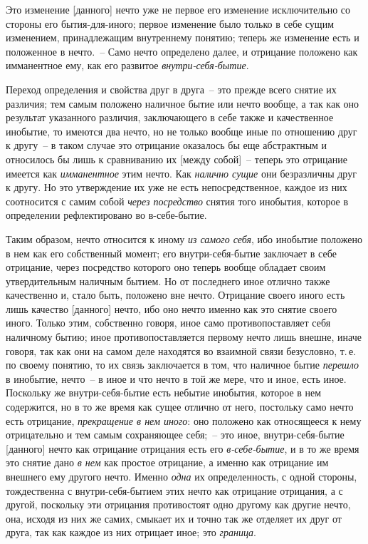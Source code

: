 Это изменение [данного] нечто уже не первое его
изменение исключительно со стороны его бытия-для-иного;
первое изменение было только в себе сущим изменением,
принадлежащим внутреннему понятию; теперь
же изменение есть и положенное в нечто.~-- Само нечто
определено далее, и отрицание положено как имманентное
ему, как его развитое \emph{внутри-себя-бытие}.

Переход определения и свойства друг в друга~-- это
прежде всего снятие их различия; тем самым положено
наличное бытие или нечто вообще, а так как оно результат
указанного различия, заключающего в себе также и
качественное инобытие, то имеются два нечто, но не
только вообще иные по отношению друг к другу~-- в таком
случае это отрицание оказалось бы еще абстрактным
и относилось бы лишь к сравниванию их [между собой]~--
теперь это отрицание имеется как \emph{имманентное} этим
нечто. Как \emph{налично сущие} они безразличны друг к другу.
Но это утверждение их уже не есть непосредственное,
каждое из них соотносится с самим собой \emph{через посредство}
снятия того инобытия, которое в определении рефлектировано
во в-себе-бытие.

Таким образом, нечто относится к иному \emph{из самого
себя}, ибо инобытие положено в нем как его собственный
момент; его внутри-себя-бытие заключает в себе отрицание,
через посредство которого оно теперь вообще обладает
своим утвердительным наличным бытием. Но от
последнего иное отлично также качественно и, стало быть,
положено вне нечто. Отрицание своего иного есть лишь
качество [данного] нечто, ибо оно нечто именно как это
снятие своего иного. Только этим, собственно говоря,
иное само противопоставляет себя наличному бытию;
иное противопоставляется первому нечто лишь внешне,
иначе говоря, так как они на самом деле находятся во
взаимной связи безусловно, т.\,е. по своему понятию, то
их связь заключается в том, что наличное бытие \emph{перешло}
в инобытие, нечто~-- в иное и что нечто в той же мере,
что и иное, есть иное. Поскольку же внутри-себя-бытие
есть небытие инобытия, которое в нем содержится, но в
то же время как сущее отлично от него, постольку само
нечто есть отрицание, \emph{прекращение в нем иного}: оно положено
как относящееся к нему отрицательно и тем самым
сохраняющее себя;~-- это иное, внутри-себя-бытие
[данного] нечто как отрицание отрицания есть его \emph{в-себе-бытие},
и в то же время это снятие дано \emph{в нем} как простое
отрицание, а именно как отрицание им внешнего
ему другого нечто. Именно \emph{одна} их определенность, с
одной стороны, тождественна с внутри-себя-бытием этих
нечто как отрицание отрицания, а с другой, поскольку
эти отрицания противостоят одно другому как другие
нечто, она, исходя из них же самих, смыкает их и точно
так же отделяет их друг от друга, так как каждое из них
отрицает иное; это \emph{граница}.

